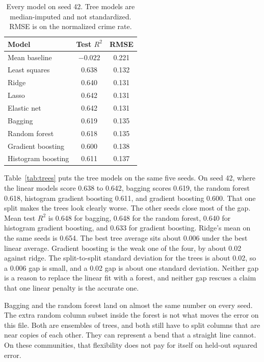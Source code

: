 \documentclass[conference]{IEEEtran}
\begin{document}
\begin{table}[t]
\caption{Every model on seed 42. Tree models are median-imputed and not standardized. RMSE is on the normalized crime rate.}
\label{tab:all}
\centering
\scriptsize
\begin{tabular}{@{}lcc@{}}
\toprule
Model & Test $R^{2}$ & RMSE \\
\midrule
Mean baseline & $-0.022$ & 0.221 \\
Least squares & 0.638 & 0.132 \\
Ridge & 0.640 & 0.131 \\
Lasso & 0.642 & 0.131 \\
Elastic net & 0.642 & 0.131 \\
Bagging & 0.619 & 0.135 \\
Random forest & 0.618 & 0.135 \\
Gradient boosting & 0.600 & 0.138 \\
Histogram boosting & 0.611 & 0.137 \\
\bottomrule
\end{tabular}
\end{table}

Table~\ref{tab:trees} puts the tree models on the same five seeds.
On seed 42, where the linear models score 0.638 to 0.642, bagging scores 0.619, the random forest 0.618, histogram gradient boosting 0.611, and gradient boosting 0.600.
That one split makes the trees look clearly worse.
The other seeds close most of the gap.
Mean test $R^{2}$ is 0.648 for bagging, 0.648 for the random forest, 0.640 for histogram gradient boosting, and 0.633 for gradient boosting.
Ridge's mean on the same seeds is 0.654.
The best tree average sits about 0.006 under the best linear average.
Gradient boosting is the weak one of the four, by about 0.02 against ridge.
The split-to-split standard deviation for the trees is about 0.02, so a 0.006 gap is small, and a 0.02 gap is about one standard deviation.
Neither gap is a reason to replace the linear fit with a forest, and neither gap rescues a claim that one linear penalty is the accurate one.

Bagging and the random forest land on almost the same number on every seed.
The extra random column subset inside the forest is not what moves the error on this file.
Both are ensembles of trees, and both still have to split columns that are near copies of each other.
They can represent a bend that a straight line cannot.
On these communities, that flexibility does not pay for itself on held-out squared error.
\end{document}
